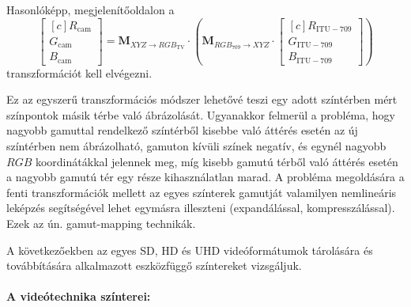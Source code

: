 %
Hasonlóképp, megjelenítőoldalon a
\begin{equation} 
\begin{bmatrix}[c]
       R_{\mathrm{cam}} \\[0.3em]
       G_{\mathrm{cam}} \\[0.3em]
       B_{\mathrm{cam}} \end{bmatrix}
       =
       \mathbf{M}_{ X\!Y\!Z \rightarrow R\!G\!B_{\mathrm{TV}} } \cdot 
\left(     \mathbf{M}_{R\!G\!B_{709}  \rightarrow X\!Y\!Z } \cdot
\begin{bmatrix}[c]
       R_{\mathrm{ITU}-709} \\[0.3em]
       G_{\mathrm{ITU}-709} \\[0.3em]
       B_{\mathrm{ITU}-709} \end{bmatrix}
 \right)
\end{equation}
transzformációt kell elvégezni.

Ez az egyszerű transzformációs módszer lehetővé teszi egy adott színtérben mért színpontok másik térbe való ábrázolását.
Ugyanakkor felmerül a probléma, hogy nagyobb gamuttal rendelkező színtérből kisebbe való áttérés esetén az új színtérben nem ábrázolható, gamuton kívüli színek negatív, és egynél nagyobb $RGB$ koordinátákkal jelennek meg, míg kisebb gamutú térből való áttérés esetén a nagyobb gamutú tér egy része kihasználatlan marad.
A probléma megoldására a fenti transzformációk mellett az egyes színterek gamutját valamilyen nemlineáris leképzés segítségével lehet egymásra illeszteni (expandálással, kompresszálással).
Ezek az ún. gamut-mapping technikák.

A következőekben az egyes SD, HD és UHD videóformátumok tárolására és továbbítására alkalmazott eszközfüggő színtereket vizsgáljuk.

\paragraph{A videótechnika színterei:\\}

